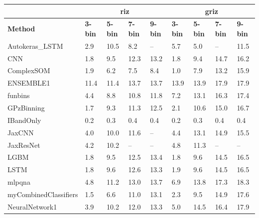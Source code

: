 \documentclass[twocolumn,twocolappendix]{aastex63}
\begin{document}
\begin{table}[]
\begin{tabular}{|l|llll|llll|}
                & \multicolumn{4}{c|}{\textbf{riz}}      & \multicolumn{4}{c|}{\textbf{griz}}                                \\ \hline
\textbf{Method} & \textbf{3-bin} & \textbf{5-bin} & \textbf{7-bin} & \textbf{9-bin} & \textbf{3-bin} & \textbf{5-bin} & \textbf{7-bin} & \textbf{9-bin} \\ \hline
{\sc Autokeras\_LSTM } & 2.9 & 10.5    & 8.2    & --    & 5.7             & 5.0             & --             & 11.5\\
{\sc CNN } & 1.8 & 9.5    & 12.3    & 13.2    & 1.8             & 9.4             & 14.7             & 16.2\\
{\sc ComplexSOM } & 1.9 & 6.2    & 7.5    & 8.4    & 1.0             & 7.9             & 13.2             & 15.9\\
{\sc ENSEMBLE1 } & 11.4 & 11.4    & 13.7    & 13.7    & 13.9             & 13.9             & 17.9             & 17.9\\
{\sc funbins } & 4.4 & 8.8    & 10.8    & 11.8    & 7.2             & 13.1             & 16.3             & 17.4\\
{\sc GPzBinning } & 1.7 & 9.3    & 11.3    & 12.5    & 2.1             & 10.6             & 15.0             & 16.7\\
{\sc IBandOnly } & 0.2 & 0.3    & 0.4    & 0.4    & 0.2             & 0.3             & 0.4             & 0.4\\
{\sc JaxCNN } & 4.0 & 10.0    & 11.6    & --    & 4.4             & 13.1             & 14.9             & 15.5\\
{\sc JaxResNet } & 4.2 & 10.2    & --    & --    & 4.8             & 11.3             & --             & --\\
{\sc LGBM } & 1.8 & 9.5    & 12.5    & 13.4    & 1.8             & 9.6             & 14.5             & 16.5\\
{\sc LSTM } & 1.8 & 9.6    & 12.6    & 13.3    & 1.9             & 9.6             & 14.5             & 16.5\\
{\sc mlpqna } & 4.8 & 11.2    & 13.0    & 13.7    & 6.9             & 13.8             & 17.3             & 18.3\\
{\sc myCombinedClassifiers } & 1.5 & 6.6    & 11.0    & 13.1    & 2.3             & 9.5             & 14.9             & 17.6\\
{\sc NeuralNetwork1 } & 3.9 & 10.2    & 12.0    & 13.3    & 5.0             & 14.5             & 16.4             & 17.9\\

\end{tabular}
\end{table}
\end{document}
